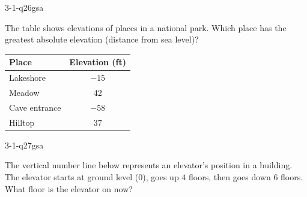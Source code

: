 \begin{practiceQuestion}{3-1-q26}{gsa}
\begin{questionText}
The table shows elevations of places in a national park. Which place has the greatest absolute elevation (distance from sea level)?

\begin{center}
\begin{tabular}{|l|c|}
\hline
\textbf{Place} & \textbf{Elevation (ft)} \\
\hline
Lakeshore & $-15$ \\ \hline
Meadow & $42$ \\ \hline
Cave entrance & $-58$ \\ \hline
Hilltop & $37$ \\ \hline
\end{tabular}
\end{center}
\end{questionText}
\end{practiceQuestion}

\begin{practiceQuestion}{3-1-q27}{gsa}
\begin{questionText}
The vertical number line below represents an elevator's position in a building. The elevator starts at ground level ($0$), goes up $4$ floors, then goes down $6$ floors. What floor is the elevator on now?

\begin{center}
\end{center}
\end{questionText}
\end{practiceQuestion}
